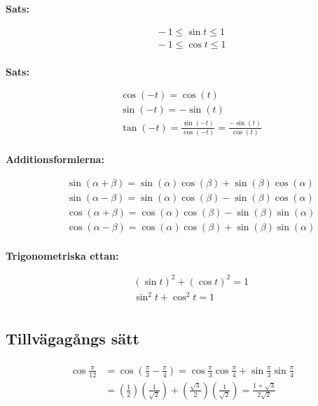 \begin{multicols}{2}
\textbf{Sats:}\par
\begin{align*}
  &\quad -1 \leq \sin{t} \leq 1 \\
  &\quad -1 \leq \cos{t} \leq 1 \\
\end{align*}

\textbf{Sats:}\par
\begin{align*}
  &\quad \cos{(-t)} = \cos{(t)} \\
  &\quad \sin{(-t)} = -\sin{(t)} \\
  &\quad \tan{(-t)} = \frac{\sin{(-t)}}{\cos{(-t)}} = \frac{-\sin{(t)}}{\cos{(t)}} \\
\end{align*}

\textbf{Additionsformlerna:}\par
\begin{align*}
  &\quad \sin{(\alpha + \beta)} = \sin{(\alpha)}\cos{(\beta)} + \sin{(\beta)}\cos{(\alpha)} \\
  &\quad \sin{(\alpha - \beta)} = \sin{(\alpha)}\cos{(\beta)} - \sin{(\beta)}\cos{(\alpha)} \\
  &\quad \cos{(\alpha + \beta)} = \cos{(\alpha)}\cos{(\beta)} - \sin{(\beta)}\sin{(\alpha)} \\
  &\quad \cos{(\alpha - \beta)} = \cos{(\alpha)}\cos{(\beta)} + \sin{(\beta)}\sin{(\alpha)} \\ 
\end{align*}

\textbf{Trigonometriska ettan:}\par
\begin{align*}
  &\quad (\sin{t})^{2} + (\cos{t})^{2} = 1 \\
  &\quad \sin^{2}{t} + \cos^{2}{t} = 1 \\ 
\end{align*}


\subsection{Tillvägagångs sätt}
\begin{align*}
  \begin{aligned} \cos \frac { \pi } { 12 } & = \cos \left( \frac { \pi } { 3 } - \frac { \pi } { 4 } \right) = \cos \frac { \pi } { 3 } \cos \frac { \pi } { 4 } + \sin \frac { \pi } { 3 } \sin \frac { \pi } { 4 } \\ & = \left( \frac { 1 } { 2 } \right) \left( \frac { 1 } { \sqrt { 2 } } \right) + \left( \frac { \sqrt { 3 } } { 2 } \right) \left( \frac { 1 } { \sqrt { 2 } } \right) = \frac { 1 + \sqrt { 3 } } { 2 \sqrt { 2 } } \end{aligned}
\end{align*}

\end{multicols}